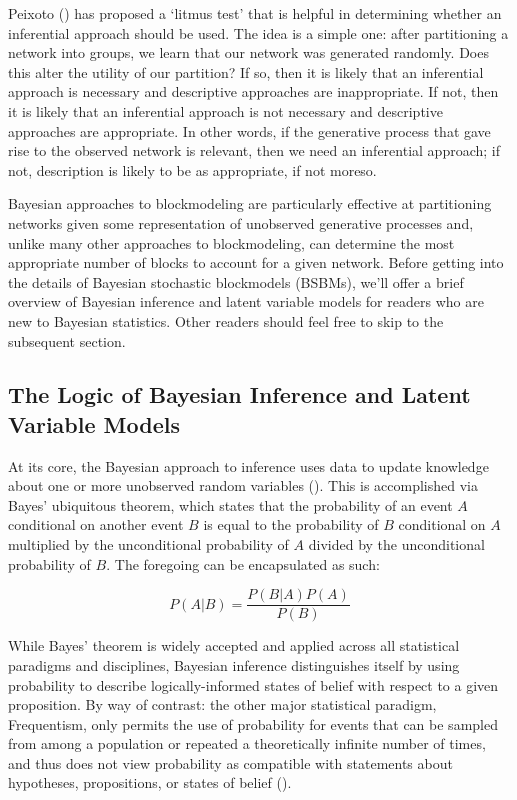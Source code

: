 \documentclass[
  12pt,
  a4paper,
  DIV=11,
  numbers=noendperiod,
  twoside,
  open=any]{scrartcl}
\begin{document}
Peixoto () has proposed a
`litmus test' that is helpful in determining whether an inferential
approach should be used. The idea is a simple one: after partitioning a
network into groups, we learn that our network was generated randomly.
Does this alter the utility of our partition? If so, then it is likely
that an inferential approach is necessary and descriptive approaches are
inappropriate. If not, then it is likely that an inferential approach is
not necessary and descriptive approaches are appropriate. In other
words, if the generative process that gave rise to the observed network
is relevant, then we need an inferential approach; if not, description
is likely to be as appropriate, if not moreso.

Bayesian approaches to blockmodeling are particularly effective at
partitioning networks given some representation of unobserved generative
processes and, unlike many other approaches to blockmodeling, can
determine the most appropriate number of blocks to account for a given
network. Before getting into the details of Bayesian stochastic
blockmodels (BSBMs), we'll offer a brief overview of Bayesian inference
and latent variable models for readers who are new to Bayesian
statistics. Other readers should feel free to skip to the subsequent
section.

\subsection{The Logic of Bayesian Inference and Latent Variable
Models}\label{the-logic-of-bayesian-inference-and-latent-variable-models}

At its core, the Bayesian approach to inference uses data to update
knowledge about one or more unobserved random variables
(). This is
accomplished via Bayes' ubiquitous theorem, which states that the
probability of an event \(A\) conditional on another event \(B\) is
equal to the probability of \(B\) conditional on \(A\) multiplied by the
unconditional probability of \(A\) divided by the unconditional
probability of \(B\). The foregoing can be encapsulated as such:

\[
P(A|B)=\frac{P(B|A)P(A)}{P(B)}
\]

While Bayes' theorem is widely accepted and applied across all
statistical paradigms and disciplines, Bayesian inference distinguishes
itself by using probability to describe logically-informed states of
belief with respect to a given proposition. By way of contrast: the
other major statistical paradigm, Frequentism, only permits the use of
probability for events that can be sampled from among a population or
repeated a theoretically infinite number of times, and thus does not
view probability as compatible with statements about hypotheses,
propositions, or states of belief
().
\end{document}
